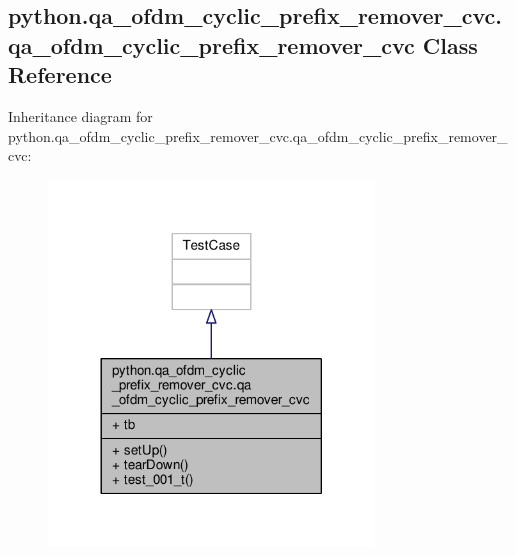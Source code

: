 \subsection{python.\+qa\+\_\+ofdm\+\_\+cyclic\+\_\+prefix\+\_\+remover\+\_\+cvc.\+qa\+\_\+ofdm\+\_\+cyclic\+\_\+prefix\+\_\+remover\+\_\+cvc Class Reference}
\label{classpython_1_1qa__ofdm__cyclic__prefix__remover__cvc_1_1qa__ofdm__cyclic__prefix__remover__cvc}


Inheritance diagram for python.\+qa\+\_\+ofdm\+\_\+cyclic\+\_\+prefix\+\_\+remover\+\_\+cvc.\+qa\+\_\+ofdm\+\_\+cyclic\+\_\+prefix\+\_\+remover\+\_\+cvc\+:
\nopagebreak
\begin{figure}[H]
\begin{center}
\leavevmode
\includegraphics[width=245pt]{d2/d06/classpython_1_1qa__ofdm__cyclic__prefix__remover__cvc_1_1qa__ofdm__cyclic__prefix__remover__cvc__inherit__graph}
\end{center}
\end{figure}



